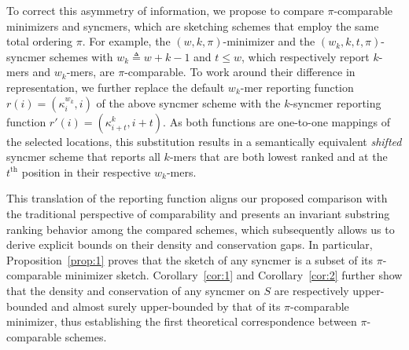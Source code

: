 
To correct this asymmetry of information, we propose to compare $\pi$-comparable minimizers and syncmers, which are sketching schemes that employ the same total ordering $\pi$. For example, the $(w, k, \pi)$-minimizer and the $(w_k, k, t, \pi)$-syncmer schemes with $w_k\triangleq w+k-1$ and $t \leq w$, which respectively report $k$-mers and $w_k$-mers, are $\pi$-comparable. To work around their difference in representation, we further replace the default $w_k$-mer reporting function $r(i)=(\kappa^{w_k}_i, i)$ of the above syncmer scheme with the $k$-syncmer reporting function $r'(i)=(\kappa^k_{i+t}, i+t)$. As both functions are one-to-one mappings of the selected locations, this substitution results in a semantically equivalent \textit{shifted} syncmer scheme that reports all $k$-mers that are both lowest ranked and at the $t^{\text{th}}$ position in their respective $w_k$-mers.

This translation of the reporting function aligns our proposed comparison with the traditional perspective of comparability and presents an invariant substring ranking behavior among the compared schemes, which subsequently allows us to derive explicit bounds on their density and conservation gaps. In particular, Proposition~\ref{prop:1} proves that the sketch of any syncmer is a subset of its $\pi$-comparable minimizer sketch. Corollary~\ref{cor:1} and Corollary~\ref{cor:2} further show that the density and conservation of any syncmer on $S$ are respectively upper-bounded and almost surely upper-bounded by that of its $\pi$-comparable minimizer, thus establishing the first theoretical correspondence between $\pi$-comparable schemes.

